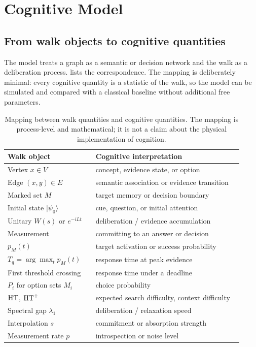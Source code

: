 \section{Cognitive Model}
\label{sec:cognitive-model}

\subsection{From walk objects to cognitive quantities}
\label{sec:cognitive-mapping}

The model treats a graph as a semantic or decision network and the walk as a
deliberation process.  lists the correspondence. The mapping
is deliberately minimal: every cognitive quantity is a statistic of the walk,
so the model can be simulated and compared with a classical baseline without
additional free parameters.

\begin{table}[t]
  \centering
  \small
  \begin{tabular}{@{}p{0.34\linewidth}p{0.58\linewidth}@{}}
    \toprule
    Walk object & Cognitive interpretation \\
    \midrule
    Vertex $x\in V$ & concept, evidence state, or option \\
    Edge $(x,y)\in E$ & semantic association or evidence transition \\
    Marked set $M$ & target memory or decision boundary \\
    Initial state $\lvert\psi_0\rangle$ & cue, question, or initial attention \\
    Unitary $W(s)$ or $e^{-iLt}$ & deliberation / evidence accumulation \\
    Measurement & committing to an answer or decision \\
    $p_M(t)$ & target activation or success probability \\
    $T_q=\arg\max_t p_M(t)$ & response time at peak evidence \\
    First threshold crossing & response time under a deadline \\
    $P_i$ for option sets $M_i$ & choice probability \\
    $\mathrm{HT}$, $\mathrm{HT}^{+}$ & expected search difficulty, context difficulty \\
    Spectral gap $\lambda_1$ & deliberation / relaxation speed \\
    Interpolation $s$ & commitment or absorption strength \\
    Measurement rate $p$ & introspection or noise level \\
    \bottomrule
  \end{tabular}
  \caption{Mapping between walk quantities and cognitive quantities. The
  mapping is process-level and mathematical; it is not a claim about the
  physical implementation of cognition.}
  \label{tab:mapping}
\end{table}

